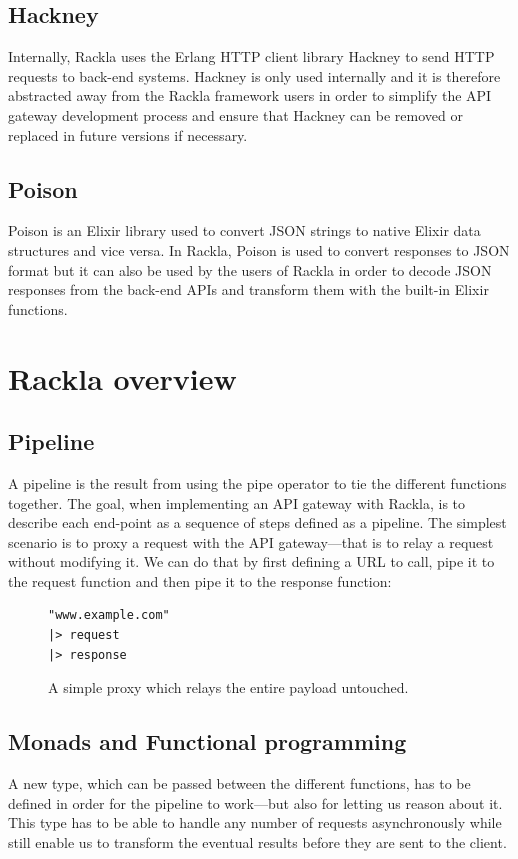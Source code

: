 \documentclass{cslthse-msc}
\begin{document}
\subsection{Hackney}
Internally, Rackla uses the Erlang HTTP client library Hackney \cite{hackney} to send HTTP requests to back-end systems. Hackney is only used internally and it is therefore abstracted away from the Rackla framework users in order to simplify the API gateway development process and ensure that Hackney can be removed or replaced in future versions if necessary.

\subsection{Poison}
Poison is an Elixir library used to convert JSON strings to native Elixir data structures and vice versa. In Rackla, Poison is used to convert responses to JSON format but it can also be used by the users of Rackla in order to decode JSON responses from the back-end APIs and transform them with the built-in Elixir functions.

\section{Rackla overview}

\subsection{Pipeline}
A pipeline is the result from using the pipe operator to tie the different functions together. The goal, when implementing an API gateway with Rackla, is to describe each end-point as a sequence of steps defined as a pipeline. The simplest scenario is to proxy a request with the API gateway---that is to relay a request without modifying it. We can do that by first defining a URL to call, pipe it to the request function and then pipe it to the response function:

\begin{figure}[H]
  \centering
\begin{lstlisting}[breaklines=true,frame=single]
"www.example.com"
|> request
|> response
\end{lstlisting}
  \caption{A simple proxy which relays the entire payload untouched.}
\end{figure}

\subsection{Monads and Functional programming}
A new type, which can be passed between the different functions, has to be defined in order for the pipeline to work---but also for letting us reason about it. This type has to be able to handle any number of requests asynchronously while still enable us to transform the eventual results before they are sent to the client.
\end{document}
